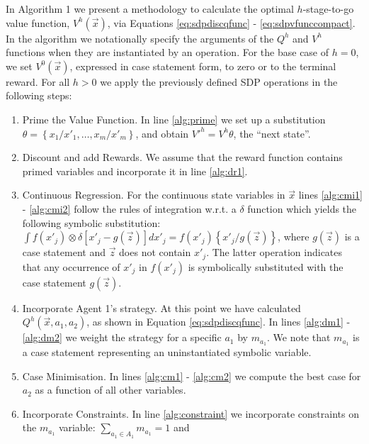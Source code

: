 In Algorithm 1 we present a methodology to calculate the optimal 
$h$-stage-to-go value function, $V^h(\vec{x})$, via Equations \eqref{eq:sdpdiscqfunc} -
\eqref{eq:sdpvfunccompact}. In the algorithm we notationally specify 
the arguments of the $Q^h$ and $V^h$ functions when they are 
instantiated by an operation. For the base case of $h = 0$, we set $V^0(\vec{x})$, expressed in 
case statement form, to zero or to the terminal reward. For all $h > 0$
we apply the previously defined SDP operations in the following steps:
\begin{enumerate}
  \item Prime the Value Function. 
            In line \ref{alg:prime} we set up a 
            substitution $\theta = \left\{ x_1/x'_1, \ldots, x_m/x'_m \right\}$, 
            and obtain $V'^{h} = V^{h}\theta$, the ``next state''.
  \item Discount and add Rewards. 
            We assume that the reward function
          contains primed variables and incorporate it in line \ref{alg:dr1}.
  \item Continuous Regression. For the continuous state variables in $\vec{x}$
            lines \ref{alg:cmi1} - \ref{alg:cmi2} follow the rules of integration w.r.t. a $\delta$ function 
            \cite{Sanner_UAI_2011} which yields the following symbolic
            substitution: 
            $\int f(x'_j) \otimes \delta\left[ x'_j - g(\vec{z})\right] dx'_j = f(x'_j)\left\{ x'_j/g(\vec{z})\right\}$,
            where $g(\vec{z})$ is a case statement and $\vec{z}$ does not contain $x'_j$.
            The latter operation indicates that any occurrence of $x'_j$ in $f(x'_j)$ is symbolically substituted
            with the case statement $g(\vec{z})$.
  \item Incorporate Agent 1's strategy. 
            At this point we have calculated $Q^h(\vec{x}, a_1, a_2)$, as shown in
            Equation \eqref{eq:sdpdiscqfunc}. In lines \ref{alg:dm1} - \ref{alg:dm2} 
            we weight the strategy for a specific $a_1$ by $m_{a_{1}}$.
            We note that $m_{a_{1}}$ is a case statement representing
            an uninstantiated symbolic variable.
  \item Case Minimisation. 
            In lines \ref{alg:cm1} - \ref{alg:cm2} we compute the best case for 
            $a_2$ as a function of all other variables. 
  \item Incorporate Constraints. 
            In line \ref{alg:constraint} we incorporate constraints on the $m_{a_{1}}$ variable: 
            $\sum_{a_{1} \in A_1} m_{a_{1}} = 1$ and 

\end{enumerate}
